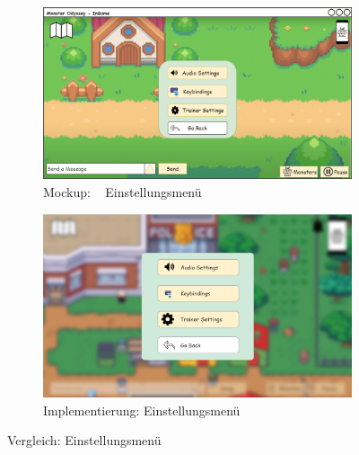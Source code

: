 \begin{figure}[H]
    \centering
    \begin{subfigure}[b]{0.4\textwidth}
        \includegraphics[width=\textwidth]{images/mockups/Bonusfeatures/AudioIngame/IngameSettingsMenu.png}
        \caption{Mockup: ~\phantom{aaaaaa} Einstellungsmenü}
        \label{fig: Mockup: Einstellungsmenü}
    \end{subfigure}
    \hfill
    \begin{subfigure}[b]{0.4\textwidth}
        \includegraphics[width=\textwidth]{images/implementation/Bonusfeatures/AudioIngame/Settingsmenu imp.png}
        \caption{Implementierung: Einstellungsmenü}
        \label{fig: Implementierung: Einstellungsmenü}
    \end{subfigure}
    \caption{Vergleich: Einstellungsmenü}
    \label{fig: Vergleich: Einstellungsmenü}
\end{figure}
